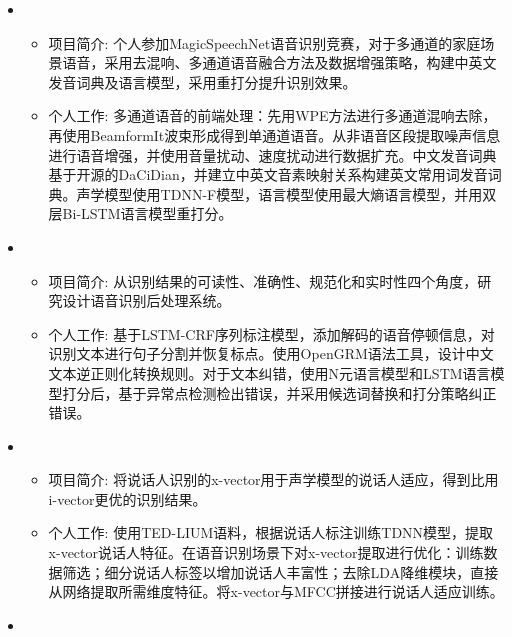   \begin{itemize}[leftmargin=*]
    \item {}
      {\small
      \begin{itemize}
        \item 项目简介: 个人参加MagicSpeechNet语音识别竞赛，对于多通道的家庭场景语音，采用去混响、多通道语音融合方法及数据增强策略，构建中英文发音词典及语言模型，采用重打分提升识别效果。
        \item 个人工作: 多通道语音的前端处理：先用WPE方法进行多通道混响去除，再使用BeamformIt波束形成得到单通道语音。从非语音区段提取噪声信息进行语音增强，并使用音量扰动、速度扰动进行数据扩充。中文发音词典基于开源的DaCiDian，并建立中英文音素映射关系构建英文常用词发音词典。声学模型使用TDNN-F模型，语言模型使用最大熵语言模型，并用双层Bi-LSTM语言模型重打分。
      \end{itemize}
      }
    \item {}
      {\small
      \begin{itemize}
        \item 项目简介: 从识别结果的可读性、准确性、规范化和实时性四个角度，研究设计语音识别后处理系统。
        \item 个人工作: 基于LSTM-CRF序列标注模型，添加解码的语音停顿信息，对识别文本进行句子分割并恢复标点。使用OpenGRM语法工具，设计中文文本逆正则化转换规则。对于文本纠错，使用N元语言模型和LSTM语言模型打分后，基于异常点检测检出错误，并采用候选词替换和打分策略纠正错误。
      \end{itemize}
      }
    \item {}
      {\small
      \begin{itemize}
        \item 项目简介: 将说话人识别的x-vector用于声学模型的说话人适应，得到比用i-vector更优的识别结果。
        \item 个人工作: 使用TED-LIUM语料，根据说话人标注训练TDNN模型，提取x-vector说话人特征。在语音识别场景下对x-vector提取进行优化：训练数据筛选；细分说话人标签以增加说话人丰富性；去除LDA降维模块，直接从网络提取所需维度特征。将x-vector与MFCC拼接进行说话人适应训练。
      \end{itemize}
      }
    \item {}
      {\small
      \begin{itemize}

\end{itemize}}
\end{itemize}
